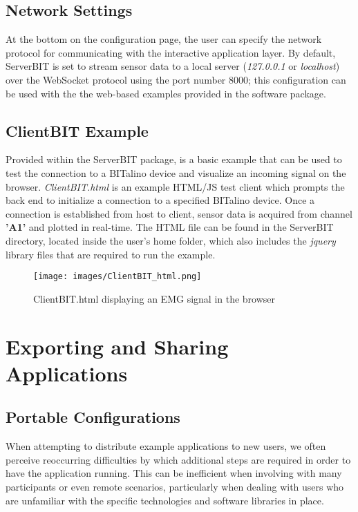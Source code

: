 \subsection{Network Settings}
At the bottom on the configuration page, the user can specify the network protocol for communicating with the interactive application layer. By default, ServerBIT is set to stream sensor data to a local server (\textit{127.0.0.1} or \textit{localhost}) over the WebSocket protocol using the port number 8000; this configuration can be used with the the web-based examples provided in the software package.

\subsection{ClientBIT Example}
Provided within the ServerBIT package, is a basic example that can be used to test the connection to a BITalino device and visualize an incoming signal on the browser. \textit{ClientBIT.html} is an example HTML/JS
test client which prompts the back end to initialize a connection to a specified BITalino device. Once a connection is established from host to client, sensor data is acquired from channel \textbf{'A1'} and plotted in real-time. The HTML file can be found in the ServerBIT directory, located inside the user's home folder, which also includes the \textit{jquery} library files that are required to run the example.

\begin{figure}[htb!]
    \centering
    \texttt{[image: images/ClientBIT\_html.png]}
    \caption{ClientBIT.html displaying an EMG signal in the browser}
    \label{fig:ClientBIT}
\end{figure}

\section{Exporting and Sharing Applications}

\subsection{Portable Configurations}

When attempting to distribute example applications to new users, we often perceive reoccurring difficulties by which additional steps are required in order to have the application running. This can be inefficient when involving with many participants or even remote scenarios, particularly when dealing with users who are unfamiliar with the specific technologies and software libraries in place.

